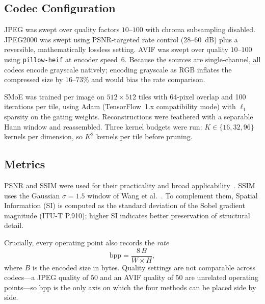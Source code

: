 \documentclass[conference]{IEEEtran}
\begin{document}
\subsection{Codec Configuration}
JPEG was swept over quality factors $10$--$100$ with chroma subsampling disabled. JPEG2000 was swept using PSNR-targeted rate control ($28$--$60$~dB) plus a reversible, mathematically lossless setting. AVIF was swept over quality $10$--$100$ using \texttt{pillow-heif} at encoder speed~$6$. Because the sources are single-channel, all codecs encode grayscale natively; encoding grayscale as RGB inflates the compressed size by $16$--$73$\% and would bias the rate comparison.

SMoE was trained per image on $512\times512$ tiles with 64-pixel overlap and 100 iterations per tile, using Adam (TensorFlow~1.x compatibility mode) with $\ell_1$ sparsity on the gating weights. Reconstructions were feathered with a separable Hann window and reassembled. Three kernel budgets were run: $K \in \{16, 32, 96\}$ kernels per dimension, so $K^2$ kernels per tile before pruning.

\subsection{Metrics}
PSNR and SSIM were used for their practicality and broad applicability~\cite{sulema2010,gireesh2018}. SSIM uses the Gaussian $\sigma=1.5$ window of Wang et al.~\cite{wang2004}. To complement them, Spatial Information (SI) is computed as the standard deviation of the Sobel gradient magnitude (ITU-T P.910); higher SI indicates better preservation of structural detail.

Crucially, every operating point also records the \emph{rate}
\begin{equation}
    \mathrm{bpp} = \frac{8\,B}{W \times H},
\end{equation}
where $B$ is the encoded size in bytes. Quality settings are not comparable across codecs---a JPEG quality of $50$ and an AVIF quality of $50$ are unrelated operating points---so bpp is the only axis on which the four methods can be placed side by side.
\end{document}
